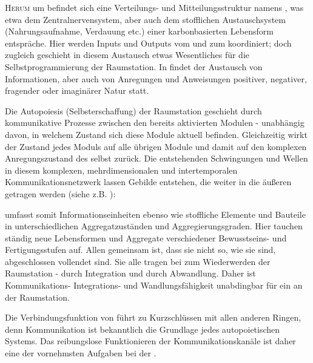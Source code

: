 \begin{newstuff}
    \lettrine{H}{erum} um  befindet sich eine Verteilungs- und Mitteilungsstruktur namens , was etwa dem Zentralnervensystem, aber auch dem stofflichen Austauschsystem (Nahrungsaufnahme, Verdauung etc.) einer karbonbasierten Lebensform entspräche. Hier werden Inputs und Outputs vom und zum  koordiniert; doch zugleich geschieht in diesem Austausch etwas Wesentliches für die Selbstprogrammierung der Raumstation. In  findet der Austausch von Informationen, aber auch von Anregungen und Anweisungen positiver, negativer, fragender oder imaginärer Natur statt. 


    Die Autopoiesis (Selbsterschaffung) der Raumstation geschieht durch kommunikative Prozesse zwischen den bereits aktivierten Modulen - unabhängig davon, in welchem Zustand sich diese Module aktuell befinden. Gleichzeitig wirkt der Zustand jedes Moduls auf alle übrigen Module und damit auf den komplexen Anregungszustand des  selbst zurück. Die entstehenden Schwingungen und Wellen in diesem komplexen, mehrdimensionalen und intertemporalen Kommunikationsnetzwerk lassen Gebilde entstehen, die weiter in die äußeren  getragen werden (siehe z.B. ):

     umfasst somit Informationseinheiten ebenso wie stoffliche Elemente und Bauteile in unterschiedlichen Aggregatzuständen und Aggregierungsgraden. Hier tauchen ständig neue Lebensformen und Aggregate verschiedener Be\-wusst\-seins- und Fertigungsstufen auf. Allen gemeinsam ist, dass sie nicht so, wie sie sind, abgeschlossen vollendet sind. Sie alle tragen bei zum Wiederwerden der Raumstation - durch Integration und durch Abwandlung. Daher ist Kom\-mu\-ni\-ka\-ti\-ons- Integrations- und Wandlungsfähigkeit unabdingbar für ein  an der Raumstation. 

    Die Verbindungsfunktion von  führt zu Kurzschlüssen mit allen anderen Ringen, denn Kommunikation ist bekanntlich die Grundlage jedes autopoietischen Systems. Das reibungslose Funktionieren der Kommunikationskanäle ist daher eine der vornehmsten Aufgaben bei der . 
\end{newstuff}